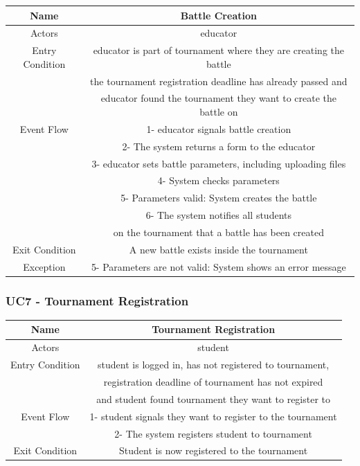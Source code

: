 \documentclass{article}
\begin{document}
\begin{tabular*}{\linewidth}{ cc }
    \hline
    Name & Battle Creation \\ 
    \hline
    Actors & educator\\ 
    \hline
    Entry Condition & educator is part of tournament where they are creating the battle\\  
                    & the tournament registration deadline has already passed and\\
                    & educator found the tournament they want to create the battle on\\
    \hline
    Event Flow & 1- educator signals battle creation\\
               & 2- The system returns a form to the educator\\
               & 3- educator sets battle parameters, including uploading files\\
               & 4- System checks parameters\\
               & 5- Parameters valid: System creates the battle\\
               & 6- The system notifies all students \\
               & on the tournament that a battle has been created\\

    \hline
    Exit Condition & A new battle exists inside the tournament\\
    \hline
    Exception & 5- Parameters are not valid: System shows an error message\\
    \hline
\end{tabular*}

\subsubsection*{UC7 - Tournament Registration}

\begin{tabular*}{\linewidth}{@{\extracolsep{\fill}} cc }
    \hline
    Name & Tournament Registration \\ 
    \hline
    Actors & student\\ 
    \hline
    Entry Condition & student is logged in, has not registered to tournament,\\
                    & registration deadline of tournament has not expired\\
                    & and student found tournament they want to register to\\
    \hline
    Event Flow & 1- student signals they want to register to the tournament\\
               & 2- The system registers student to tournament\\
    \hline
    Exit Condition & Student is now registered to the tournament\\
    \hline
\end{tabular*}
\end{document}
